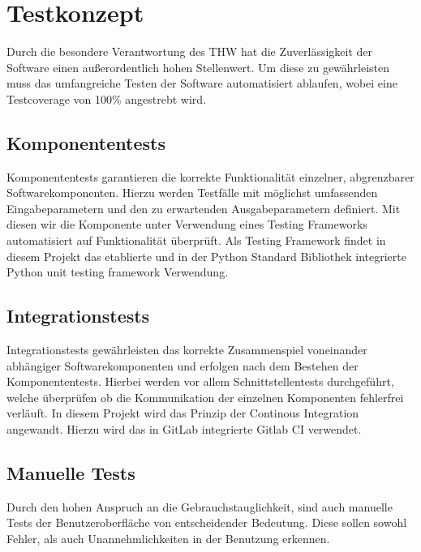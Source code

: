 \section{Testkonzept}
Durch die besondere Verantwortung des THW hat die Zuverlässigkeit der Software einen außerordentlich hohen Stellenwert. Um diese zu gewährleisten muss das umfangreiche Testen der Software automatisiert ablaufen, wobei eine Testcoverage von 100\% angestrebt wird.
\subsection{Komponententests}
Komponententests garantieren die korrekte Funktionalität einzelner, abgrenzbarer Softwarekomponenten. Hierzu werden Testfälle mit möglichst umfassenden Eingabeparametern und den zu erwartenden Ausgabeparametern definiert. Mit diesen wir die Komponente unter Verwendung eines Testing Frameworks automatisiert auf Funktionalität überprüft. Als Testing Framework findet in diesem Projekt das etablierte und in der Python Standard Bibliothek integrierte Python unit testing framework Verwendung.
\subsection{Integrationstests} 
Integrationstests gewährleisten das korrekte Zusammenspiel voneinander abhängiger Softwarekomponenten und erfolgen nach dem Bestehen der Komponententests. Hierbei werden vor allem Schnittstellentests durchgeführt, welche überprüfen ob die Kommunikation der einzelnen Komponenten fehlerfrei verläuft. In diesem Projekt wird das Prinzip der Continous Integration angewandt. Hierzu wird das in GitLab integrierte Gitlab CI verwendet.
\subsection{Manuelle Tests}
Durch den hohen Anspruch an die Gebrauchstauglichkeit, sind auch manuelle Tests der Benutzeroberfläche von entscheidender Bedeutung. Diese sollen sowohl Fehler, als auch Unannehmlichkeiten in der Benutzung erkennen.